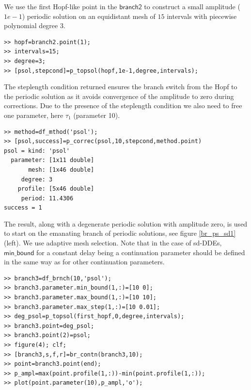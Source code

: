 \documentclass[10pt]{article}
\gdef \parm#1{{\mathsf{#1}}}
\begin{document}
{We use the first Hopf-like point in the $\parm{branch2}$ 
to construct a small amplitude ($1e-1$)
periodic solution on an equidistant mesh of
$15$ intervals with piecewise polynomial degree $3$.
{\small\begin{verbatim}
>> hopf=branch2.point(1);
>> intervals=15;
>> degree=3;
>> [psol,stepcond]=p_topsol(hopf,1e-1,degree,intervals);
\end{verbatim}}
The steplength condition returned ensures the branch switch from the
Hopf to the periodic solution as it avoids convergence of  
the amplitude 
to zero during corrections. Due to the presence of the
steplength condition we also need to
free one parameter, here $\tau_1$ (parameter 10).
{\small\begin{verbatim}
>> method=df_mthod('psol');
>> [psol,success]=p_correc(psol,10,stepcond,method.point)
psol = kind: 'psol'
  parameter: [1x11 double]
       mesh: [1x46 double]
     degree: 3
    profile: [5x46 double]
     period: 11.4306 
success = 1
\end{verbatim}}
The result, along with a degenerate periodic solution with amplitude
zero, is used to start on the emanating branch of periodic solutions,
see figure \ref{br_ps_sd1} (left). We use adaptive mesh selection.
Note that in the case of sd-DDEs, $\parm{min\_bound}$
for a constant delay being a continuation parameter
should be defined in the same way as for other continuation parameters.
{\small\begin{verbatim}
>> branch3=df_brnch(10,'psol');
>> branch3.parameter.min_bound(1,:)=[10 0];
>> branch3.parameter.max_bound(1,:)=[10 10];
>> branch3.parameter.max_step(1,:)=[10 0.01];
>> deg_psol=p_topsol(first_hopf,0,degree,intervals);
>> branch3.point=deg_psol;
>> branch3.point(2)=psol;
>> figure(4); clf;
>> [branch3,s,f,r]=br_contn(branch3,10);
>> point=branch3.point(end);
>> p_ampl=max(point.profile(1,:))-min(point.profile(1,:));
>> plot(point.parameter(10),p_ampl,'o');
\end{verbatim}}
\begin{figure}[h]
\begin{center}

\end{center}
\end{figure}}
\end{document}
